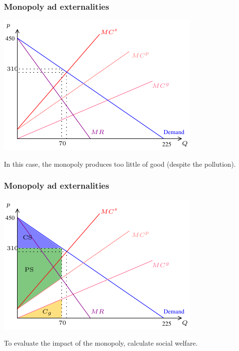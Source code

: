 \documentclass[xcolor=pdftex,dvipsnames]{beamer}
\begin{document}
\begin{frame}
  \frametitle{Monopoly ad externalities}
  \begin{center}
    \includegraphics{pics/Monop1}
  \end{center}
In this case, the monopoly produces too little of good (despite the pollution).

\end{frame}
\begin{frame}
  \frametitle{Monopoly ad externalities}
  \begin{center}
    \includegraphics{pics/Monop2}
  \end{center}
To evaluate the impact of the monopoly, calculate social welfare.
\\
\
\end{frame}
\end{document}
